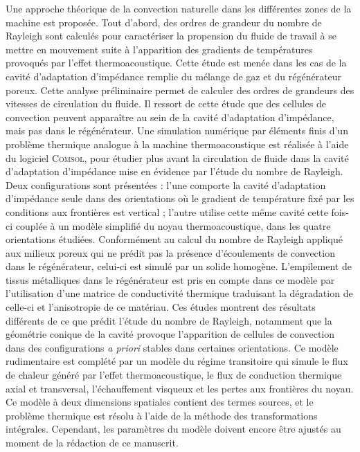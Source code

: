 Une approche théorique de la convection naturelle dans les différentes zones de la machine est proposée. Tout d'abord, des ordres de grandeur du nombre de Rayleigh sont calculés pour caractériser la propension du fluide de travail à se mettre en mouvement suite à l'apparition des gradients de températures provoqués par l'effet thermoacoustique. Cette étude est menée dans les cas de la cavité d'adaptation d'impédance remplie du mélange de gaz et du régénérateur poreux. Cette analyse préliminaire permet de calculer des ordres de grandeurs des vitesses de circulation du fluide. Il ressort de cette étude que des cellules de convection peuvent apparaître au sein de la cavité d'adaptation d'impédance, mais pas dans le régénérateur. Une simulation numérique par éléments finis d'un problème thermique analogue à la machine thermoacoustique est réalisée à l'aide du logiciel \textsc{Comsol}, pour étudier plus avant la circulation de fluide dans la cavité d'adaptation d'impédance mise en évidence par l'étude du nombre de Rayleigh. Deux configurations sont présentées : l'une comporte la cavité d'adaptation d'impédance seule dans des orientations où le gradient de température fixé par les conditions aux frontières est vertical ; l'autre utilise cette même cavité cette fois-ci couplée à un modèle simplifié du noyau thermoacoustique, dans les quatre orientations étudiées. Conformément au calcul du nombre de Rayleigh appliqué aux milieux poreux qui ne prédit pas la présence d'écoulements de convection dans le régénérateur, celui-ci est simulé par un solide homogène. L'empilement de tissus métalliques dans le régénérateur est pris en compte dans ce modèle par l'utilisation d'une matrice de conductivité thermique traduisant la dégradation de celle-ci et l'anisotropie de ce matériau. Ces études montrent des résultats différents de ce que prédit l'étude du nombre de Rayleigh, notamment que la géométrie conique de la cavité provoque l'apparition de cellules de convection dans des configurations \textit{a priori} stables dans certaines orientations. Ce modèle rudimentaire est complété par un modèle du régime transitoire qui simule le flux de chaleur généré par l'effet thermoacoustique, le flux de conduction thermique axial et transversal, l'échauffement visqueux et les pertes aux frontières du noyau. Ce modèle à deux dimensions spatiales contient des termes sources, et le problème thermique est résolu à l'aide de la méthode des transformations intégrales. Cependant, les paramètres du modèle doivent encore être ajustés au moment de la rédaction de ce manuscrit.\medskip

